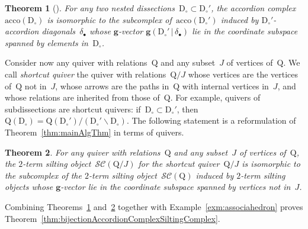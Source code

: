 \documentclass{amsart}
\newtheorem{theorem}{Theorem}%
\theoremstyle{definition}
\renewcommand{\b}[1]{\mathbf{#1}} %
\newcommand{\ssm}{\smallsetminus} %
\newcommand{\darkblue}{\color{darkblue}} %
\newcommand{\defn}[1]{\textsl{\darkblue #1}} %
\newcommand{\vincent}[1]{\todo[color=blue!30]{#1 \\ \hfill --- V.}}
\newcommand{\accordionComplex}{\mathrm{acco}} %
\newcommand{\dissection}{\mathrm{D}} %
\newcommand{\sign}[3]{\varepsilon \big( {#1} \in {#2}\;|\;{#3} \big)} %
\newcommand{\gvector}[2]{\mathbf{g}(#1 \,|\, #2)} %
\newcommand{\quiver}{\mathrm{Q}} %
\newcommand{\siltingComplex}{\mathcal{SC}}
\begin{document}
\begin{theorem}[\cite{MannevillePilaud-accordion}]
\label{thm:contractDiagonals}
For any two nested dissections~$\dissection_\circ \subset \dissection_\circ'$, the accordion complex~$\accordionComplex(\dissection_\circ)$ is isomorphic to the subcomplex of~$\accordionComplex(\dissection_\circ')$ induced by $\dissection_\circ'$-accordion diagonals~$\delta_\bullet$ whose $\b{g}$-vector $\gvector{\dissection_\circ'}{\delta_\bullet}$ lie in the coordinate subspace spanned by elements in~$\dissection_\circ$.
\end{theorem}

Consider now any quiver with relations~$\quiver$ and any subset~$J$ of vertices of~$\quiver$.
We call \defn{shortcut quiver} the quiver with relations~$\quiver/J$ whose vertices are the vertices of~$\quiver$ not in~$J$, whose arrows are the paths in~$\quiver$ with internal vertices in~$J$, and whose relations are inherited from those of~$\quiver$.
For example, quivers of subdissections are shortcut quivers: if~$\dissection_\circ \subset \dissection_\circ'$, then~${\quiver(\dissection_\circ) = \quiver(\dissection_\circ')/(\dissection_\circ' \ssm \dissection_\circ)}$.
The following statement is a reformulation of Theorem~\ref{thm:mainAlgThm} in terms of quivers.
\vincent{Not really}

\begin{theorem}
\label{thm:contractVertices}
For any quiver with relations~$\quiver$ and any subset~$J$ of vertices of~$\quiver$, the $2$-term silting object~$\siltingComplex(\quiver/J)$ for the shortcut quiver~$\quiver/J$ is isomorphic to the subcomplex of the $2$-term silting object~$\siltingComplex(\quiver)$ induced by $2$-term silting objects whose $\b{g}$-vector lie in the coordinate subspace spanned by vertices not in~$J$.
\end{theorem}

Combining Theorems~\ref{thm:contractDiagonals} and~\ref{thm:contractVertices} together with Example~\ref{exm:associahedron} proves Theorem~\ref{thm:bijectionAccordionComplexSiltingComplex}.
\end{document}
